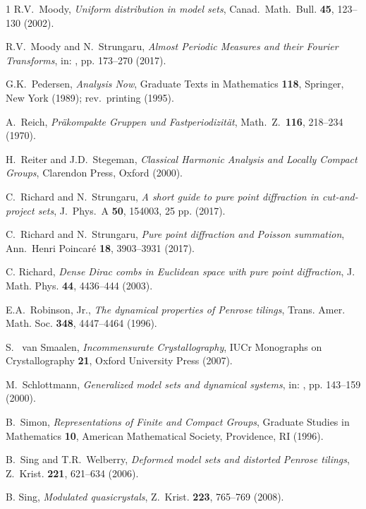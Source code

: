 \documentclass[11pt, a4wide]{amsart}
\numberwithin{lemma}{section}
\begin{document}
\begin{thebibliography}{1}
{R.V.~Moody,
\textit{Uniform distribution in model sets},
Canad.\ Math.\ Bull. {\bf 45}, 123--130 (2002).}

{R.V.~Moody and N.~Strungaru, \textit{Almost Periodic Measures and their Fourier
Transforms}, in: \cite{BG3}, pp. 173--270  (2017).}


{G.K.~Pedersen,
\textit{Analysis Now}, Graduate Texts in Mathematics \textbf{118},
Springer, New York (1989); rev.\ printing (1995).}

{A.~Reich, \textit{Pr\"akompakte Gruppen und Fastperiodizit\"at}, Math.~Z.~\textbf{116}, 218--234 (1970).}

{H.~Reiter and  J.D.~Stegeman, \textit{Classical Harmonic Analysis and Locally Compact Groups}, Clarendon Press, Oxford (2000).}

{C.~Richard and N.~Strungaru, \textit{A short guide to pure point diffraction in cut-and-project sets},  J.~Phys.~A \textbf{50}, 154003, 25 pp. (2017).}

{C.~Richard and N.~Strungaru,
\textit{Pure point diffraction and Poisson summation},
Ann.~Henri Poincar\'e \textbf{18}, 3903--3931 (2017).}

{C. Richard,  \textit{Dense Dirac combs in Euclidean space with pure point diffraction},  J. Math. Phys.  \textbf{44}, 4436--444 (2003).}

{E.A.~Robinson, Jr., \textit{The dynamical properties of Penrose tilings}, Trans. Amer. Math. Soc. \textbf{348}, 4447--4464 (1996).}

{S.~ van Smaalen, \textit{Incommensurate Crystallography},
IUCr Monographs on Crystallography \textbf{21}, Oxford
University Press (2007).}

{M.~Schlottmann,
\textit{Generalized model sets and dynamical systems}, in: \cite{BMed}, pp. 143--159 (2000).}

{B.~Simon, 
\textit{Representations of Finite and Compact Groups}, Graduate Studies in Mathematics \textbf{10}, American Mathematical Society, Providence, RI (1996).} 

{B.~Sing and T.R.~Welberry,
\textit{Deformed model sets and distorted Penrose tilings},
Z.~Krist. \textbf{221}, 621--634 (2006).}

{B. Sing, \textit{Modulated quasicrystals},
Z.~Krist. \textbf{223}, 765--769 (2008).}


\end{thebibliography}
\end{document}
